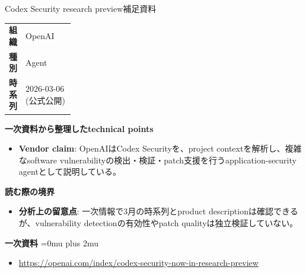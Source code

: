 \begin{technicalnote}{Codex Security research preview}{補足資料}
\begingroup
\begin{tabularx}{\linewidth}{@{}>{\bfseries}p{0.22\linewidth}X@{}}
組織 & OpenAI \\
種別 & Agent \\
時系列 & 2026-03-06 (公式公開) \\
\end{tabularx}
\smallskip
{\bfseries 一次資料から整理したtechnical points}
\begin{itemize}[leftmargin=1.5em,itemsep=0.35em]
\item \textbf{Vendor claim}: OpenAIはCodex Securityを、project contextを解析し、複雑なsoftware vulnerabilityの検出・検証・patch支援を行うapplication-security agentとして説明している。
\end{itemize}
\begin{minipage}{\linewidth}
{\bfseries 読む際の境界}
\begin{itemize}[leftmargin=1.5em,itemsep=0.35em]
\item \textbf{分析上の留意点}: 一次情報で3月の時系列とproduct descriptionは確認できるが、vulnerability detectionの有効性やpatch qualityは独立検証していない。
\end{itemize}
\begin{samepage}
{\bfseries 一次資料}
\begingroup\sloppy
\Urlmuskip=0mu plus 2mu\relax
\begin{itemize}[leftmargin=1.5em,itemsep=0.25em]
\item {\scriptsize\url{https://openai.com/index/codex-security-now-in-research-preview}}
\end{itemize}
\endgroup
\end{samepage}
\end{minipage}
\endgroup
\end{technicalnote}
\medskip
